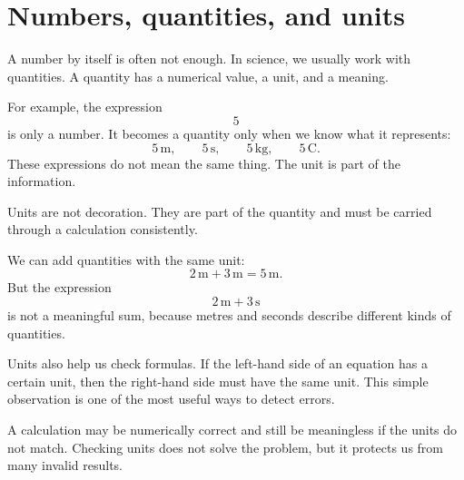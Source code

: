 \section{Numbers, quantities, and units}

A number by itself is often not enough. In science, we usually work with quantities. A quantity has a numerical value, a unit, and a meaning.

For example, the expression
\[
5
\]
is only a number. It becomes a quantity only when we know what it represents:
\[
5\,\mathrm{m}, \qquad 5\,\mathrm{s}, \qquad 5\,\mathrm{kg}, \qquad 5\,\mathrm{C}.
\]
These expressions do not mean the same thing. The unit is part of the information.

\begin{remarkbox}
Units are not decoration. They are part of the quantity and must be carried through a calculation consistently.
\end{remarkbox}

We can add quantities with the same unit:
\[
2\,\mathrm{m} + 3\,\mathrm{m} = 5\,\mathrm{m}.
\]
But the expression
\[
2\,\mathrm{m} + 3\,\mathrm{s}
\]
is not a meaningful sum, because metres and seconds describe different kinds of quantities.

Units also help us check formulas. If the left-hand side of an equation has a certain unit, then the right-hand side must have the same unit. This simple observation is one of the most useful ways to detect errors.

\begin{summarybox}
A calculation may be numerically correct and still be meaningless if the units do not match. Checking units does not solve the problem, but it protects us from many invalid results.
\end{summarybox}
